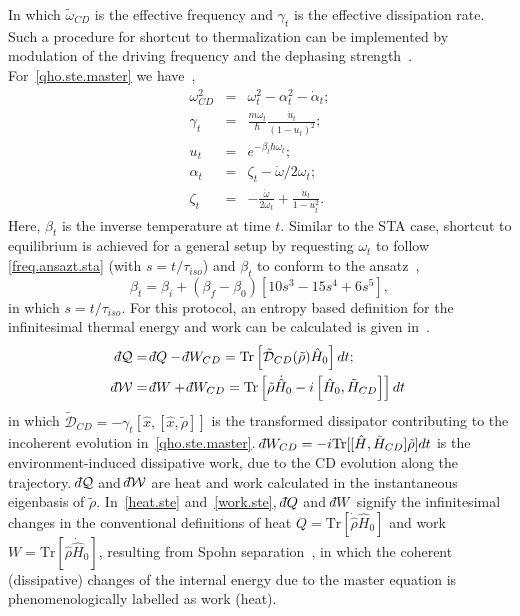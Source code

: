 \documentclass[aps,pra,twocolumn,showpacs,showkeys,groupedaddress,nobalancelastpage,nofootinbib,floatfix,superscriptaddress,longbibliography]{revtex4-2}
\begin{document}
In which $\tilde{\omega}_{CD}$ is the effective frequency and $\gamma_t$ is the effective dissipation rate. Such a procedure for shortcut to thermalization can be implemented by modulation of the driving frequency and the dephasing strength~\cite{Alipour2020shortcutsto,PhysRevResearch.2.033178}. For~\cref{qho.ste.master} we have~\cite{Alipour2020shortcutsto},
\begin{eqnarray}\label{qho.ste.param}
  \omega_{CD}^2 &=& \omega_t^2 - \alpha_t^2 - \dot{\alpha}_t; \\
  \gamma_t &=& \frac{m\omega_t}{\hbar}\frac{\dot{u}_t}{(1-u_t)^2}; \\
   u_t &=& e^{-\beta_t \hbar \omega_t}; \\
   \alpha_t &=& \zeta_t - \dot{\omega}/2\omega_t; \\
   \zeta_t &=& -\frac{\dot{\omega}}{2\omega_t} + \frac{\dot{u}_t}{1-u_t^2}.
\end{eqnarray}
Here, $\beta_t$ is the inverse temperature at time $t$. Similar to the STA case, shortcut to equilibrium is achieved for a general setup by requesting $\omega_t$ to follow \cref{freq.ansazt.sta} (with $s=t/\tau_{iso}$) and $\beta_t$ to conform to the ansatz~\cite{Alipour2020shortcutsto},
\begin{equation}\label{beta.ansazt.ste}
   \beta_t = \beta_i + (\beta_f - \beta_0)[10s^3-15s^4+6s^5],
\end{equation}
in which $s=t/\tau_{iso}$. For this protocol, an entropy based definition for the infinitesimal thermal energy and work can be calculated is given in~\cite{PhysRevA.105.L040201}.
\begin{align}
    \dbar\mathcal{Q} &= \dbar Q - \dbar W_{CD} = \text{Tr}\left[\tilde{\mathcal{D}}_{CD}(\tilde{\rho}) \hat{H}_0 \right]dt;\label{heat.ste}\\
    \dbar\mathcal{W} &= \dbar W + \dbar W_{CD} = \text{Tr}\left[\tilde{\rho}\dot{\hat{H}}_0-i\left[\hat{H}_0,\tilde{H}_{CD} \right] \right]dt\label{work.ste}
\end{align}
in which $\tilde{\mathcal{D}}_{CD}=- \gamma_t \left[\hat{x}, \left[\hat{x}, \tilde{\rho}\right]\right]$ is the transformed dissipator contributing to the incoherent evolution in~\cref{qho.ste.master}. $\dbar W_{CD}=-i\text{Tr}[[\hat{H},\tilde{H}_{CD}] \tilde{\rho}]dt$ is the environment-induced dissipative work, due to the CD evolution along the trajectory. $\dbar\mathcal{Q}$ and $\dbar\mathcal{W}$ are heat and work calculated in the instantaneous eigenbasis of $\tilde{\rho}$. In~\cref{heat.ste} and~\cref{work.ste}, $\dbar Q$ and $\dbar W$ signify the infinitesimal changes in the conventional definitions of heat $Q=\text{Tr}[\dot{\hat{\rho}}\hat{H}_0]$ and work $W=\text{Tr}[\hat{\rho}\dot{\hat{H}}_0]$, resulting from Spohn separation~\cite{10.1063/1.523789}, in which the coherent (dissipative) changes of the internal energy due to the master equation is phenomenologically labelled as work (heat).\\
\end{document}
